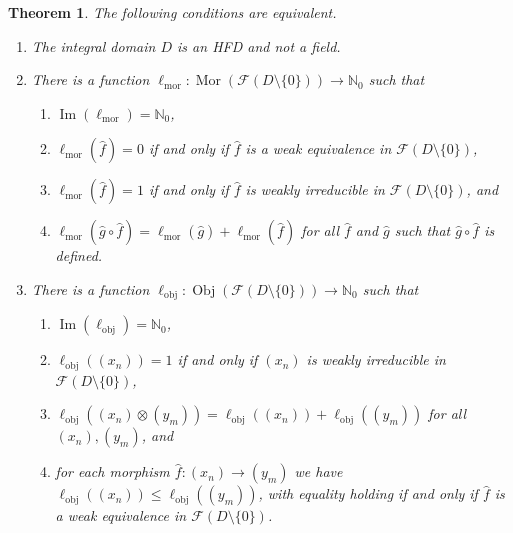 \documentclass[reqno]{amsart}
\theoremstyle{plain}
\newtheorem{thm}[lem]{Theorem}
\theoremstyle{definition}
\newcommand{\cat}[1]{\mathcal{#1}}
\newcommand{\catf}{\cat{F}}
\newcommand{\im}{\operatorname{Im}}
\newcommand{\bbn}{\mathbb{N}}
\renewcommand{\leq}{\leqslant}
\numberwithin{equation}{lem}
\newcommand{\zaks}[1]{\ell_{\text{#1}}}
\newcommand{\zaksmor}{\zaks{mor}}
\newcommand{\zaksobj}{\zaks{obj}}
\newcommand{\objd}{\operatorname{Obj}(\catf(D \setminus \{0\}))}
\newcommand{\mord}{\operatorname{Mor}(\catf(D \setminus \{0\}))}
\begin{document}
\begin{thm}\label{prop170918a}
The following conditions are equivalent.
\begin{enumerate}[\rm(i)]
\item\label{prop170918a1}
The integral domain $D$ is an HFD and not a field.
\item\label{prop170918a2}
There is a function $\zaksmor\colon\mord\to\bbn_0$
such that 
\begin{enumerate}
\item\label{prop170918a2a}
$\im(\zaksmor)=\bbn_0$, 
\item\label{prop170918a2d}
$\zaksmor(\hat f)=0$ if and only if $\hat f$ is a weak equivalence in $\catf(D\setminus\{0\})$,
\item\label{prop170918a2b}
$\zaksmor(\hat f)=1$ if and only if $\hat f$ is weakly irreducible in $\catf(D\setminus\{0\})$,
and
\item\label{prop170918a2c}
$\zaksmor(\hat g\circ\hat f)=\zaksmor(\hat g)+\zaksmor(\hat f)$ for all $\hat f$ and $\hat g$ such that $\hat g\circ\hat f$ is defined.
\end{enumerate}
\item\label{prop170918a3}
There is a function $\zaksobj\colon\objd\to\bbn_0$
such that 
\begin{enumerate}
\item\label{prop170918a3a}
$\im(\zaksobj)=\bbn_0$, 
\item\label{prop170918a3b}
$\zaksobj((x_n))=1$ if and only if $(x_n)$ is  
weakly
irreducible in $\catf(D\setminus\{0\})$,
\item\label{prop170918a3c}
$\zaksobj((x_n)\otimes(y_m))=\zaksobj((x_n))+\zaksobj((y_m))$ for all  $(x_n),(y_m)$, and
\item\label{prop170918a3d}
for each morphism $\hat f\colon(x_n)\to(y_m)$ we have $\zaksobj((x_n))\leq\zaksobj((y_m))$,
with equality holding if and only if $\hat f$ is a weak equivalence in $\catf(D\setminus\{0\})$.
\end{enumerate}
\end{enumerate}
\end{thm}
\end{document}
